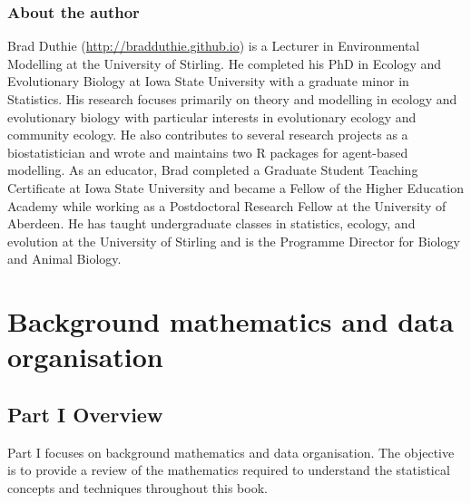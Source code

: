 \documentclass[
  openany]{scrbook}
\begin{document}
\hypertarget{author}{%
\section*{About the author}\label{author}}

Brad Duthie (\url{http://bradduthie.github.io}) is a Lecturer in Environmental Modelling at the University of Stirling.
He completed his PhD in Ecology and Evolutionary Biology at Iowa State University with a graduate minor in Statistics.
His research focuses primarily on theory and modelling in ecology and evolutionary biology with particular interests in evolutionary ecology and community ecology.
He also contributes to several research projects as a biostatistician and wrote and maintains two R packages for agent-based modelling.
As an educator, Brad completed a Graduate Student Teaching Certificate at Iowa State University and became a Fellow of the Higher Education Academy while working as a Postdoctoral Research Fellow at the University of Aberdeen.
He has taught undergraduate classes in statistics, ecology, and evolution at the University of Stirling and is the Programme Director for Biology and Animal Biology.

\hypertarget{part-background-mathematics-and-data-organisation}{%
\part{Background mathematics and data organisation}\label{part-background-mathematics-and-data-organisation}}

\hypertarget{Week1}{%
\chapter*{Part I Overview}\label{Week1}}

Part I focuses on background mathematics and data organisation.
The objective is to provide a review of the mathematics required to understand the statistical concepts and techniques throughout this book.
\end{document}
